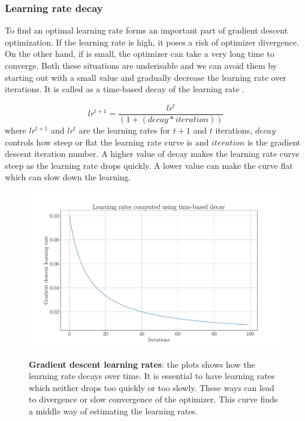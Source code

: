 \subsubsection{Learning rate decay}
To find an optimal learning rate forms an important part of gradient descent optimization. If the learning rate is high, it poses a risk of optimizer divergence. On the other hand, if is small, the optimizer can take a very long time to converge. Both these situations are underisable and we can avoid them by starting out with a small value and gradually decrease the learning rate over iterations. It is called as a time-based decay of the learning rate \cite{articleRuderS}.

\begin{equation}
lr^{t+1} = \frac{lr^t}{( 1 + ( decay * iteration ) )}
\end{equation}
where $lr^{t+1}$ and $lr^t$ are the learning rates for $t+1$ and $t$ iterations,   $decay$ controls how steep or flat the learning rate curve is and $iteration$ is the gradient descent iteration number. A higher value of decay makes the learning rate curve steep as the learning rate drops quickly. A lower value can make the curve flat which can slow down the learning.

\begin{figure}[h]
\begin{centering}
    {\includegraphics[scale=0.33]{figures/Learning_rates_PV.pdf}}
    \caption[Learning rates]{\textbf{Gradient descent learning rates}: the plots shows how the learning rate decays over time. It is essential to have learning rates which neither drops too quickly or too slowly. These ways can lead to divergence or slow convergence of the optimizer. This curve finds a middle way of estimating the learning rates.}
\end{centering}
\end{figure}


